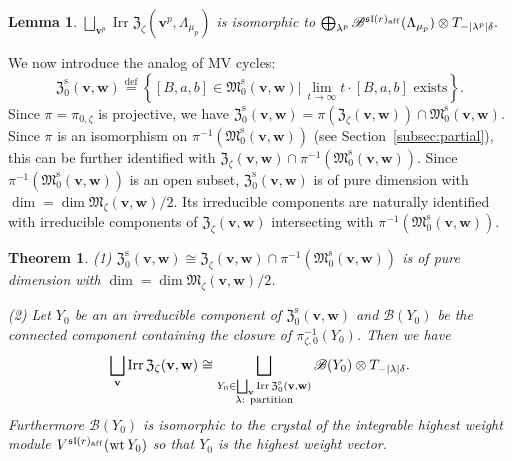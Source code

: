 \documentclass[pdftex]{sigma}
\newtheorem{Theorem}[equation]{Theorem}
\newtheorem{Lemma}[equation]{Lemma}
\theoremstyle{definition}
\numberwithin{equation}{section}
\newcommand{\subsecref}[1]{Section~\ref{#1}}
\newcommand{\defeq}{\overset{\operatorname{\scriptstyle def}}{=}}
\newcommand{\algsl}{\operatorname{\mathfrak{sl}}} %
\newcommand{\M}{{\mathfrak M}} %
\newcommand{\Mreg}{\M^{\operatorname{s}}}
\newcommand{\bv}{{\mathbf v}} %
\newcommand{\bw}{{\mathbf w}} %
\newcommand{\Irr}{\operatorname{Irr}}
\newcommand{\aff}{\mathrm{af\/f}}
\begin{document}
\begin{Lemma}\label{lem:Fock}
\(
   \bigsqcup_{\bv^p} \Irr\mathfrak Z_\zeta(\bv^p,\Lambda_{\mu_p})
\)
is isomorphic to
\(
  \bigoplus_{\lambda^p}
  \mathscr B^{{\algsl}(r)_\aff}(\Lambda_{\mu_p})
  \otimes T_{-|\lambda^p|\delta}.
\)
\end{Lemma}

We now introduce the analog of MV cycles:
\begin{equation*}
  \mathfrak Z_0^{\operatorname{s}}(\bv,\bw) \defeq
  \left\{ [B,a,b]\in\Mreg_0(\bv,\bw) \big|\,
      \text{$\displaystyle\lim_{t\to \infty} t\cdot[B,a,b]$ exists}
      \right\}.
\end{equation*}
Since $\pi = \pi_{0,\zeta}$ is projective, we have
$\mathfrak Z_0^{\operatorname{s}}(\bv,\bw)
= \pi(\mathfrak Z_\zeta(\bv,\bw))\cap\Mreg_0(\bv,\bw)$. Since $\pi$ is an
isomorphism on $\pi^{-1}(\Mreg_0(\bv,\bw))$ (see
\subsecref{subsec:partial}), this can be further identif\/ied with
$\mathfrak Z_\zeta(\bv,\bw)\cap\pi^{-1}(\Mreg_0(\bv,\bw))$. Since
$\pi^{-1}(\Mreg_0(\bv,\bw))$ is an open subset,
$\mathfrak Z_0^{\operatorname{s}}(\bv,\bw)$ is of pure dimension with
$\dim = \dim\M_\zeta(\bv,\bw)/2$. Its irreducible components are naturally
identif\/ied with irreducible components of
$\mathfrak Z_\zeta(\bv,\bw)$ intersecting with
$\pi^{-1}(\Mreg_0(\bv,\bw))$.

\begin{Theorem}\label{thm:MV}
  \textup{(1)} $\mathfrak Z_0^{\operatorname{s}}(\bv,\bw) \cong
  \mathfrak Z_\zeta(\bv,\bw)\cap\pi^{-1}(\Mreg_0(\bv,\bw))$ is of pure
  dimension with $\dim = \dim\M_\zeta(\bv,\bw)/2$.

  \textup{(2)} Let $Y_0$ be an an irreducible component of $\mathfrak
  Z_0^{\operatorname{s}}(\bv,\bw)$ and $\mathscr B(Y_0)$ be the
  connected component containing the closure of
  $\pi_{\zeta,0}^{-1}(Y_0)$. Then we have
  \begin{equation*}
   \bigsqcup_{\bv} \Irr\mathfrak Z_\zeta(\bv,\bw)
   \cong
   \bigsqcup_{\substack{Y_0\in\bigsqcup_{\bv} \Irr\mathfrak
       Z_0^{\operatorname{s}}(\bv,\bw) \\
       \text{\rm $\lambda$: partition}}}
     \mathscr B(Y_0)\otimes T_{-|\lambda|\delta}.
  \end{equation*}
  Furthermore $\mathscr B(Y_0)$ is isomorphic to the crystal of the
  integrable highest weight module
  $V^{\algsl(r)_\aff}\linebreak[2](\operatorname{wt} Y_0)$ so that $Y_0$ is the
  highest weight vector.
\end{Theorem}
\end{document}
